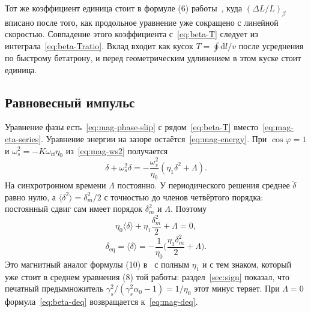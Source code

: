 Тот же коэффициент единица стоит в формуле (6) работы~\cite{Senichev2013}, куда $(\Delta L/L)_\beta$ вписано после того, как продольное уравнение уже сокращено с линейной скоростью. Совпадение этого коэффициента с~\eqref{eq:beta-T} следует из интеграла~\eqref{eq:beta-Tratio}. Вклад входит как кусок $T=\oint\mathrm{d}l/v$ после усреднения по быстрому бетатрону, и перед геометрическим удлинением в этом куске стоит единица.

\subsection{Равновесный импульс}
\label{sec:ch2-eq}

Уравнение фазы есть~\eqref{eq:mag-phase-slip} с рядом~\eqref{eq:beta-T} вместо~\eqref{eq:mag-eta-series}. Уравнение энергии на зазоре остаётся~\eqref{eq:mag-energy}. При $\cos\varphi=1$ и $\omega_s^2=-K\omega_{\mathrm{rf}}\eta_0$ из~\eqref{eq:mag-ws2} получается
\begin{equation}
\label{eq:beta-osc}
\ddot\delta+\omega_s^2\delta
=-\frac{\omega_s^2}{\eta_0}(\eta_1\delta^2+\Lambda).
\end{equation}
На синхротронном времени $\Lambda$ постоянно. У периодического решения среднее $\ddot\delta$ равно нулю, а $\langle\delta^2\rangle=\delta_m^2/2$ с точностью до членов четвёртого порядка: постоянный сдвиг сам имеет порядок $\delta_m^2$ и $\Lambda$. Поэтому
\begin{equation}
\label{eq:beta-avg}
\eta_0\langle\delta\rangle+\eta_1\frac{\delta_m^2}{2}+\Lambda=0,
\end{equation}
\begin{equation}
\label{eq:beta-deq}
\delta_{\mathrm{eq}}
=\langle\delta\rangle
=-\frac{1}{\eta_0}
\Biggl(\frac{\eta_1\delta_m^2}{2}+\Lambda\Biggr).
\end{equation}
Это магнитный аналог формулы (10) в~\cite{Senichev2013} с полным $\eta_1$ и с тем знаком, который уже стоит в среднем уравнения (8) той работы: раздел~\ref{sec:sign} показал, что печатный предымножитель $\gamma_s^2/(\gamma_s^2\alpha_0-1)=1/\eta_0$ этот минус теряет. При $\Lambda=0$ формула~\eqref{eq:beta-deq} возвращается к~\eqref{eq:mag-deq}.

